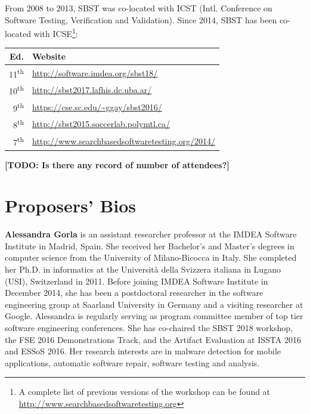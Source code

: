 \documentclass[10pt,conference]{IEEEtran}
\newcommand{\TODO}[1]{\textbf{\textcolor{ScarletRed}{[TODO: #1]}}\xspace}
\newcommand{\TODO}[1]{}
\begin{document}
From 2008 to 2013, SBST was co-located with ICST (Intl. Conference on
Software Testing, Verification and Validation). Since 2014, SBST has
been co-located with ICSE\footnote{A complete list of previous
  versions of the workshop can be found at
  \url{http://www.searchbasedsoftwaretesting.org}}:
\begin{table}[h]
\centering
\begin{tabular}{rl}\toprule
Ed. & Website \\\midrule
11\textsuperscript{th} & \url{http://software.imdea.org/sbst18/} \\
10\textsuperscript{th} & \url{http://sbst2017.lafhis.dc.uba.ar/} \\
9\textsuperscript{th}  & \url{https://cse.sc.edu/~ggay/sbst2016/} \\
8\textsuperscript{th}  & \url{http://sbst2015.soccerlab.polymtl.ca/} \\
7\textsuperscript{th}  & \url{http://www.searchbasedsoftwaretesting.org/2014/}\\\bottomrule
\end{tabular}
\end{table}

\TODO{Is there any record of number of attendees?}

\section{Proposers' Bios}

{\bf Alessandra Gorla} is an assistant researcher professor at the
IMDEA Software Institute in Madrid, Spain. She received her Bachelor's
and Master's degrees in computer science from the University of
Milano-Bicocca in Italy. She completed her Ph.D. in informatics at the
Universit\`a della Svizzera italiana in Lugano (USI), Switzerland in
2011. Before joining IMDEA Software Institute in December 2014, she
has been a postdoctoral researcher in the software engineering group
at Saarland University in Germany and a visiting researcher at Google.
Alessandra is regularly serving as program committee member of top
tier software engineering conferences. She has co-chaired the SBST
2018 workshop, the FSE 2016 Demonstrations Track, and the Artifact
Evaluation at ISSTA 2016 and ESSoS 2016.  Her research interests are
in malware detection for mobile applications, automatic software
repair, software testing and analysis.
\end{document}
